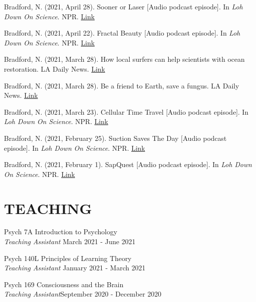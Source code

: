 \documentclass[margin, 10pt]{res} %
\begin{document}
\begin{resume}
Bradford, N. (2021, April 28). Sooner or Laser [Audio podcast episode]. In {\sl Loh Down On Science}. NPR. \href{https://lohdownonscience.com/sooner-or-laser/}{Link}

Bradford, N. (2021, April 22). Fractal Beauty [Audio podcast episode]. In {\sl Loh Down On Science}. NPR. \href{https://lohdownonscience.com/fractal-beauty/}{Link}

Bradford, N. (2021, March 28). How local surfers can help scientists with ocean restoration. LA Daily News. \href{https://www.dailynews.com/2021/03/28/how-local-surfers-can-help-scientists-with-ocean-restoration/}{Link}

Bradford, N. (2021, March 28). Be a friend to Earth, save a fungus. LA Daily News. \href{https://www.dailynews.com/2021/03/28/be-a-friend-to-earth-save-a-fungus/}{Link}

Bradford, N. (2021, March 23). Cellular Time Travel [Audio podcast episode]. In {\sl Loh Down On Science}. NPR.  \href{https://lohdownonscience.com/cellular-time-travel/}{Link}

Bradford, N. (2021, February 25). Suction Saves The Day [Audio podcast episode]. In {\sl Loh Down On Science}. NPR.  \href{https://lohdownonscience.com/suction-saves-the-day/}{Link}

Bradford, N. (2021, February 1). SapQuest [Audio podcast episode]. In {\sl Loh Down On Science}. NPR.  \href{https://lohdownonscience.com/sapquest/}{Link}





\section{TEACHING}
Psych 7A Introduction to Psychology \\ 
{\sl Teaching Assistant} \hfill {March 2021 - June 2021}

Psych 140L Principles of Learning Theory \\ 
{\sl Teaching Assistant} \hfill {January 2021 - March 2021} 

Psych 169 Consciousness and the Brain \\
{\sl Teaching Assistant}\hfill {September 2020 - December 2020} 




\end{resume}
\end{document}
